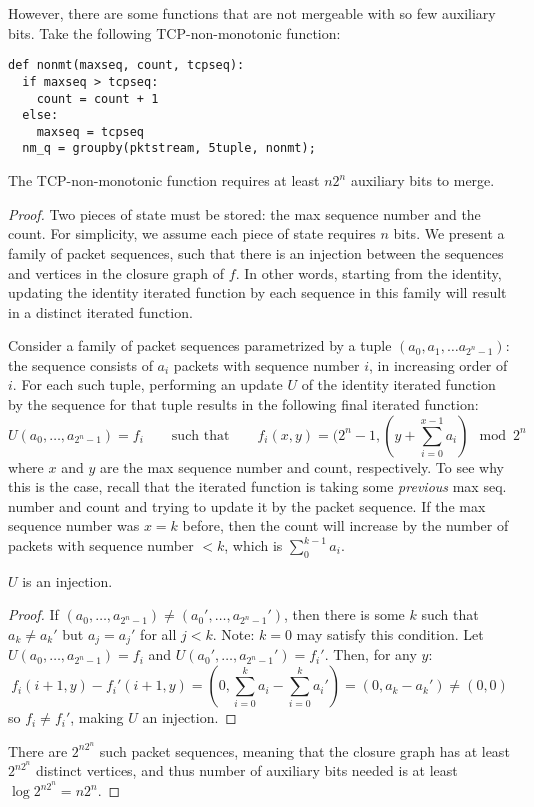 However, there are some functions that are not mergeable with so few auxiliary bits. Take the following TCP-non-monotonic function:
\begin{verbatim}
def nonmt(maxseq, count, tcpseq):
  if maxseq > tcpseq:
    count = count + 1
  else:
    maxseq = tcpseq
  nm_q = groupby(pktstream, 5tuple, nonmt);
\end{verbatim}

\begin{theorem}[Theorem 4.3.3]
The TCP-non-monotonic function requires at least $n2^n$ auxiliary bits to merge.
\end{theorem}
\begin{proof}
Two pieces of state must be stored: the max sequence number and the count. For simplicity, we assume each piece of state requires $n$ bits.
We present a family of packet sequences, such that there is an injection between the sequences and vertices in the closure graph of $f$. In other words, starting from the identity, updating the identity iterated function by each sequence in this family will result in a distinct iterated function. 

Consider a family of packet sequences parametrized by a tuple $(a_0, a_1, \ldots a_{2^n-1})$: the sequence consists of $a_i$ packets with sequence number $i$, in increasing order of $i$. For each such tuple, performing an update $U$ of the identity iterated function by the sequence for that tuple results in the following final iterated function:
\[ U(a_0, \ldots, a_{2^n-1}) = f_i\quad\quad \text{such that} \quad\quad f_i(x,y) = (2^n - 1, (y + \sum_{i=0}^{x-1} a_i) \mod 2^n \]
where $x$ and $y$ are the max sequence number and count, respectively. To see why this is the case, recall that the iterated function is taking some \emph{previous} max seq. number and count and trying to update it by the packet sequence. If the max sequence number was $x = k$ before, then the count will increase by the number of packets with sequence number $< k$, which is $\sum_0^{k-1} a_i$.
\begin{lemma}
$U$ is an injection.
\end{lemma}
\begin{proof}
If $(a_0, \ldots, a_{2^n-1}) \neq (a_0', \ldots, a_{2^n-1}')$, then there is some $k$ such that $a_k \neq a_k'$ but $a_j = a_j'$ for all $j < k$. Note: $k= 0$ may satisfy this condition. Let $U(a_0, \ldots, a_{2^n-1}) = f_i$ and $U(a_0', \ldots, a_{2^n-1}') = f_i'$. Then, for any $y$:
\[ f_i(i+1, y) - f_i'(i+1,y) = \left(0, \sum_{i = 0}^k a_i - \sum_{i = 0}^k a_i'\right) = (0, a_k - a_k') \neq (0, 0) \]
so $f_i \neq f_i'$, making $U$ an injection.
\end{proof}
There are $2^{n2^n}$ such packet sequences, meaning that the closure graph has at least $2^{n2^n}$ distinct vertices, and thus number of auxiliary bits needed is at least $\log 2^{n2^n} = n2^n$. 
\end{proof}

